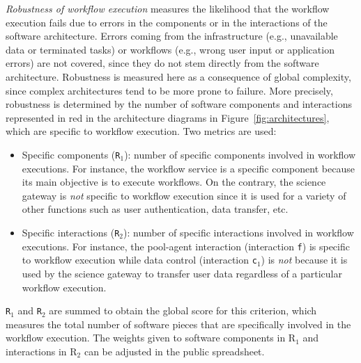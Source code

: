 \documentclass[preprint,3p,twocolumn]{elsarticle}
\newcommand{\correction}[1]{\color{blue}#1\color{black}\xspace}
\begin{document}
\emph{Robustness of workflow execution} measures the likelihood that the
workflow execution fails due to errors in the components or in the
interactions of the software architecture. Errors coming
from the infrastructure (e.g., unavailable data or terminated tasks)
or workflows (e.g., wrong user input or application errors) are not
covered, since they do not stem directly from the software
architecture. 
Robustness is measured here as a consequence of global
complexity, since complex architectures tend to be more prone to
failure. More precisely, robustness is determined by the number of
software components and interactions represented in
red in the architecture diagrams in
Figure~\ref{fig:architectures}, which are specific to workflow
execution. Two metrics are used:
\begin{itemize}[leftmargin=0cm,itemindent=0.35cm,itemsep=0cm]
\item Specific components (\texttt{R$_1$}): number of specific
  components involved in workflow executions. \correction{For instance, the
  workflow service is a specific component because its main objective
  is to execute workflows. On the contrary, the science gateway is
  \emph{not} specific to workflow execution since it is used for a
  variety of other functions such as user authentication, data
  transfer, etc.}
\item Specific interactions (\texttt{R$_2$}): number of specific
  interactions involved in workflow executions. \correction{For
    instance, the pool-agent interaction (interaction \texttt{f}) is
    specific to workflow execution while data control (interaction
    \texttt{c$_1$}) is \emph{not} because it is used by the science gateway to transfer
    user data regardless of a particular workflow execution}.
\end{itemize}
\texttt{R$_1$} and \texttt{R$_2$} are
summed to obtain the global score for this criterion, which measures
the total number of software pieces that are specifically involved in
the workflow execution. \correction{The weights given to software components in R$_1$ and interactions in R$_2$ can be adjusted in the public spreadsheet.}
\end{document}
